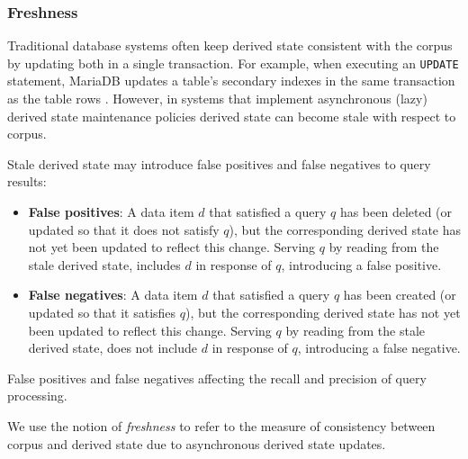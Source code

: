 \subsubsection{Freshness}
\label{sec:models_freshness}

Traditional database systems often keep derived state consistent with the corpus by updating both in a single transaction.
For example, when executing an \texttt{UPDATE} statement, MariaDB updates a table's secondary indexes in the same transaction
as the table rows \cite{innodb:writepaths}.
However, in systems that implement asynchronous (lazy) derived state maintenance policies \cite{tan:diffindex,
qi:secondaryindexconsistency, shukla:schemaagnostic} derived state can become stale with respect to corpus.

Stale derived state may introduce false positives and false negatives to query results:
\begin{itemize}
  \item \textbf{False positives}: A data item $d$ that satisfied a query $q$ has been deleted
  (or updated so that it does not satisfy $q$),
  but the corresponding derived state has not yet been updated to reflect this change.
  Serving $q$ by reading from the stale derived state, includes $d$ in response of $q$, introducing a false positive.

  \item \textbf{False negatives}: A data item $d$ that satisfied a query $q$ has been created
  (or updated so that it satisfies $q$),
  but the corresponding derived state has not yet been updated to reflect this change.
  Serving $q$ by reading from the stale derived state, does not include $d$ in response of $q$, introducing a false negative.
\end{itemize}

False positives and false negatives affecting the recall and precision of query processing.

We use the notion of \textit{freshness} to refer to the measure of consistency between corpus and derived state due to
asynchronous derived state updates.

